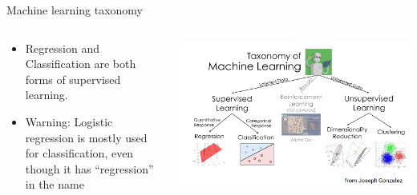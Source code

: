 \documentclass[aspectratio=169]{../latex_main/tntbeamer}  %
\begin{document}
	
	\begin{frame}[c]{Machine learning taxonomy}
	    \begin{columns}
	        \begin{column}{.5\textwidth}
	        
	            \begin{itemize}
	                \item Regression and Classification are both forms of supervised learning. 
	                \item \alert{Warning:} Logistic regression is mostly used for classification, even though it has “regression” in the name
	            \end{itemize}
	        
	        \end{column}
	        
	        \begin{column}{.5\textwidth}
	        
	                    \centering
	                    \includegraphics[scale=.3]{Bild2}
	                    
	        \end{column}
	    \end{columns}
	\end{frame}
\end{document}
